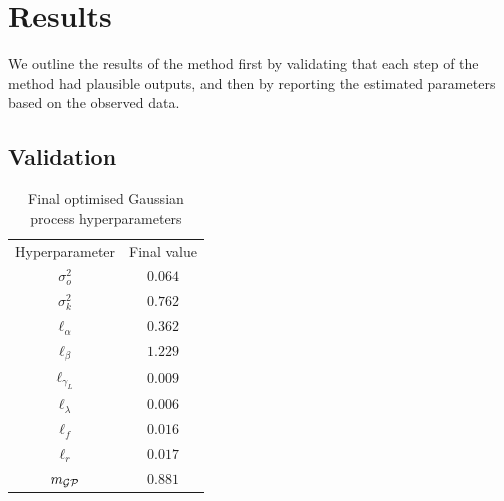\chapter{Results}

We outline the results of the method first by validating that each step of
the method had plausible outputs, and then by reporting the estimated
parameters based on the observed data.

\section{Validation}

\begin{table}[htbp]
    \caption{
        Final optimised Gaussian process hyperparameters
    }
    \label{tab:trained_hps}
    \centering
    \begin{tabular}{c|c}
        Hyperparameter    & Final value \\
        $\sigma_o^2$      & $0.064$      \\
        $\sigma_k^2$      & $0.762$     \\
        $\ell_\alpha$     & $0.362$     \\
        $\ell_\beta$      & $1.229$     \\
        $\ell_{\gamma_L}$ & $0.009$     \\
        $\ell_\lambda$    & $0.006$     \\
        $\ell_f$          & $0.016$     \\
        $\ell_r$          & $0.017$     \\
        $m_{\mathcal{GP}}$           & $0.881$
    \end{tabular}
\end{table}

